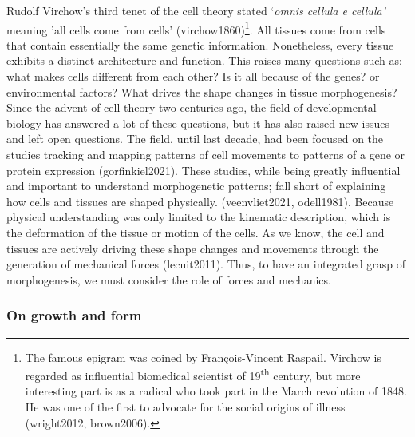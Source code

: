 \documentclass[
]{article}
\begin{document}
Rudolf Virchow's third tenet of the cell theory stated `\emph{omnis
cellula e cellula'} meaning 'all cells come from cells'
(virchow1860)\footnote{The famous epigram was coined by François-Vincent
  Raspail. Virchow is regarded as influential biomedical scientist of
  19\textsuperscript{th} century, but more interesting part is as a
  radical who took part in the March revolution of 1848. He was one of
  the first to advocate for the social origins of illness (wright2012,
  brown2006).}. All tissues come from cells that contain essentially the
same genetic information. Nonetheless, every tissue exhibits a distinct
architecture and function. This raises many questions such as: what
makes cells different from each other? Is it all because of the genes?
or environmental factors? What drives the shape changes in tissue
morphogenesis? Since the advent of cell theory two centuries ago, the
field of developmental biology has answered a lot of these questions,
but it has also raised new issues and left open questions. The field,
until last decade, had been focused on the studies tracking and mapping
patterns of cell movements to patterns of a gene or protein expression
(gorfinkiel2021). These studies, while being greatly influential and
important to understand morphogenetic patterns; fall short of explaining
how cells and tissues are shaped physically. (veenvliet2021, odell1981).
Because physical understanding was only limited to the kinematic
description, which is the deformation of the tissue or motion of the
cells. As we know, the cell and tissues are actively driving these shape
changes and movements through the generation of mechanical forces
(lecuit2011). Thus, to have an integrated grasp of morphogenesis, we
must consider the role of forces and mechanics.

\hypertarget{on-growth-and-form}{%
\subsubsection{On growth and form}\label{on-growth-and-form}}
\end{document}

